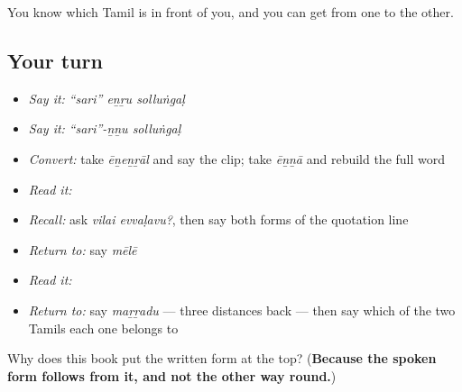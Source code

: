 \begin{grammarlens}[title={What you've built}]
You know which Tamil is in front of you, and you can get from one to the other.
\end{grammarlens}

\subsection*{Your turn}
\begin{itemize}
\raggedright
  \item \emph{Say it:} \emph{\textquotedblleft{}sari\textquotedblright{} eṉṟu solluṅgaḷ}
  \item \emph{Say it:} \emph{\textquotedblleft{}sari\textquotedblright{}-ṉṉu solluṅgaḷ}
  \item \emph{Convert:} take \emph{ēṉeṉṟāl} and say the clip; take \emph{ēṉṉā} and rebuild the full word
  \item \emph{Read it:} \textbf{}
  \item \emph{Recall:} ask \emph{vilai evvaḷavu?}, then say both forms of the quotation line
  \item \emph{Return to:} say \emph{mēlē}
  \item \emph{Read it:} \textbf{}
  \item \emph{Return to:} say \emph{maṟṟadu} — three distances back — then say which of the two Tamils each one belongs to
\end{itemize}

\begin{tcolorbox}[breakable,colback=teal!4,colframe=teal!35!black,title={Before you move on}]
Why does this book put the written form at the top? (\textbf{Because the spoken form follows from it, and not the other way round.})
\end{tcolorbox}
